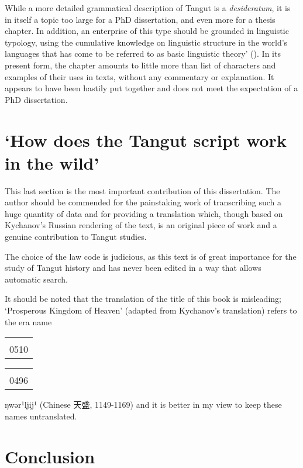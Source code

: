 \documentclass[oneside,a4paper,11pt]{article}
\newcommand{\ipa}[1]{{\phon#1}} %
\newcommand{\zh}[1]{{\cn#1}}
\newcommand{\tgf}[1]{\begin{tabular}{l}\mo{#1}\\{\tiny #1}\end{tabular}}
\begin{document}
While a more detailed grammatical description of Tangut is a \textit{desideratum}, it is in itself a topic too large for a PhD dissertation, and even more for a thesis chapter. In addition, an enterprise of this type should be grounded in linguistic typology, using the cumulative knowledge on linguistic structure in the world's languages that has come to be referred to as  basic linguistic theory' (\citealt{dixon10basic2}). In its present form, the chapter amounts to little more than list of characters and examples of their uses in texts, without any commentary or explanation. It appears to have been hastily put together and does not meet the expectation of a PhD dissertation.

\section{`How does the Tangut script work in the wild'}
This last section is the most important contribution of this dissertation. The author should be commended for the painstaking work of transcribing such a huge quantity of data and for providing a translation which, though based on Kychanov's Russian rendering of the text, is an original piece of work and a genuine contribution to Tangut studies.

The choice of the law code is judicious, as this text is of great importance for the study of Tangut history and has never been edited in a way that allows automatic search.

It should be noted that the translation of the title of this book is misleading; `Prosperous Kingdom of Heaven' (adapted from Kychanov's translation) refers to the era name \tgf{0510}\tgf{0496} \ipa{ŋwər¹ljịj¹} (Chinese \zh{天盛}, 1149-1169) and it is better in my view to keep these names untranslated.

\section*{Conclusion}



\end{document}
